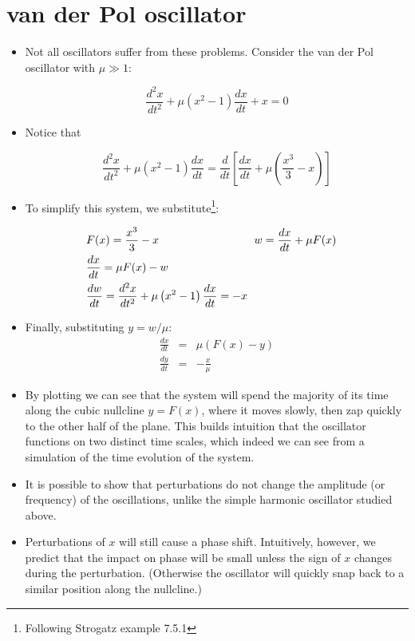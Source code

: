 \documentclass{article}
\begin{document}
\section*{van der Pol oscillator}
\begin{itemize}
\item Not all oscillators suffer from these problems. Consider the van der Pol oscillator with $\mu \gg 1$:

\[ \frac{d^2 x}{dt^2} + \mu \left( x^2 -1 \right)\frac{dx}{dt} + x = 0 \]

\item Notice that

\[ \frac{d^2 x}{dt^2} + \mu \left( x^2 -1 \right)\frac{dx}{dt} = \frac{d}{dt} \left[ \frac{dx}{dt} + \mu \left( \frac{x^3}{3} - x \right) \right] \]

\item To simplify this system, we substitute\footnote{Following Strogatz example 7.5.1}:

\begin{eqnarray*}
&F(x) = \frac{x^3}{3} - x \hspace{3 cm} w = \frac{dx}{dt} + \mu F(x)&\\
&\frac{dx}{dt} = \mu F(x) - w&\\
& \frac{dw}{dt} =  \frac{d^2 x}{dt^2} + \mu \left( x^2 -1 \right)\frac{dx}{dt} = -x&
\end{eqnarray*}

\item Finally, substituting $y=w/\mu$:
\begin{eqnarray*}
\frac{dx}{dt} & = & \mu \left(F(x) - y \right)\\
 \frac{dy}{dt} & = & -\frac{x}{\mu}
\end{eqnarray*}

\item By plotting we can see that the system will spend the majority of its time along the cubic nullcline $y=F(x)$, where it moves slowly, then zap quickly to the other half of the plane. This builds intuition that the oscillator functions on two distinct time scales, which indeed we can see from a simulation of the time evolution of the system.

\item It is possible to show that perturbations do not change the amplitude (or frequency) of the oscillations, unlike the simple harmonic oscillator studied above.

\item Perturbations of $x$ will still cause a phase shift. Intuitively, however, we predict that the impact on phase will be small unless the sign of $x$ changes during the perturbation. (Otherwise the oscillator will quickly snap back to a similar position along the nullcline.)


\end{itemize}
\end{document}
